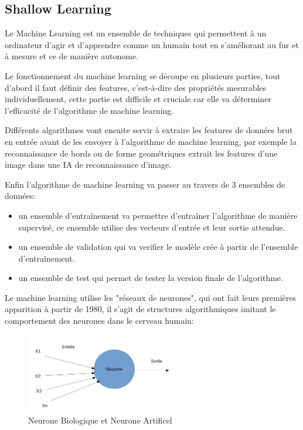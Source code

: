         \subsection{Shallow Learning}
            Le Machine Learning est un ensemble de techniques qui permettent à un ordinateur
            d'agir et d'apprendre comme un humain tout en s'améliorant au fur et
            à mesure et ce de manière autonome. \newline

            Le fonctionnement du machine learning se découpe en plusieurs parties,
            tout d'abord il faut définir des features, c'est-à-dire des
            propriétés mesurables individuellement, cette partie est difficile et cruciale
            car elle va déterminer l'efficacité de l'algorithme de machine learning. \newline

            Différents algorithmes vont ensuite servir à extraire les features de données
            brut en entrée avant de les envoyer à l'algorithme de machine learning, par exemple
            la reconnaissance de bords ou de forme geométriques extrait les features d'une
            image dans une IA de reconnaissance d'image. \newline

            Enfin l'algorithme de machine learning va passer au travers de 3 ensembles de données:
            \begin{itemize}
                \item un ensemble d'entraînement va permettre d'entraîner l'algorithme de manière
                supervisé, ce ensemble utilise des vecteurs d'entrée et leur sortie attendue.
                \item un ensemble de validation qui va verifier le modèle crée à partir de l'ensemble
                d'entraînement.
                \item un ensemble de test qui permet de tester la version finale de l'algorithme.
                \newline
            \end{itemize}

            Le machine learning utilise les "réseaux de neurones", qui ont fait leurs premières
            apparition à partir de 1980, il s'agit de structures algorithmiques imitant
            le comportement des neurones dans le cerveau humain:


            \begin{figure}[H]
                \centering
                \includegraphics[width=0.6\textwidth]{Images/neuroneartificiel}
                \caption{Neurone Biologique et Neurone Artificel}
                \label{fig:NN2Layers}
            \end{figure}

